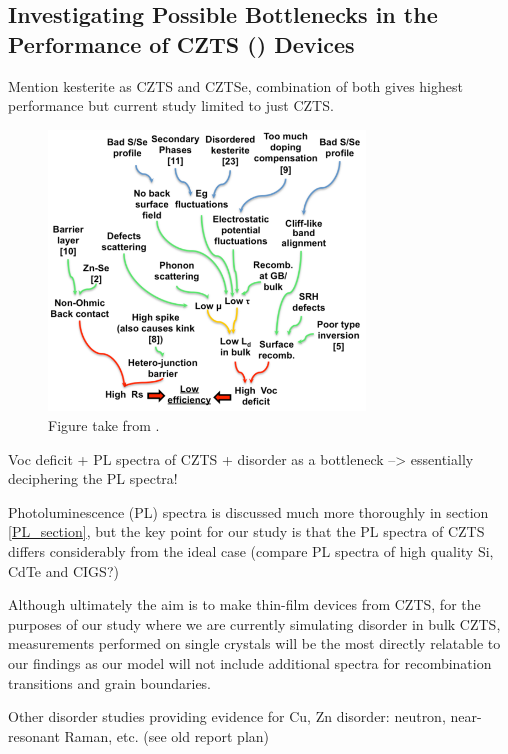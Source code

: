 \subsection{Investigating Possible Bottlenecks in the Performance of CZTS (\CZTS) Devices}

Mention kesterite as CZTS and CZTSe, combination of both gives highest performance but current study limited to just CZTS.

\begin{figure}[h!]
  \centering
    \includegraphics[width=0.75\textwidth]{figures/kesterite_bottlenecks.png}
    \caption{Figure take from .}
  \label{kesterite_bottlenecks}
\end{figure}

Voc deficit + PL spectra of CZTS + disorder as a bottleneck --> essentially deciphering the PL spectra!
 
Photoluminescence (PL) spectra is discussed much more thoroughly in section \ref{PL_section}, but the key point for our study is that the PL spectra of CZTS differs considerably from the ideal case
(compare PL spectra of high quality Si, CdTe and CIGS?)

Although ultimately the aim is to make thin-film devices from CZTS, for the purposes of our study where we are currently simulating disorder in bulk CZTS, measurements performed on single crystals will be the most directly relatable to our findings as our model will not include additional spectra for recombination transitions and grain boundaries.

Other disorder studies providing evidence for Cu, Zn disorder: neutron, near-resonant Raman, etc. (see old report plan)

